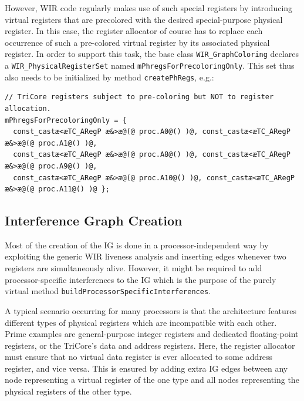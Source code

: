 However, \gls{WIR} code regularly makes use of such special registers by introducing virtual registers that are precolored with the desired special-purpose physical register.
In this case, the register allocator of course has to replace each occurrence of such a pre-colored virtual register by its associated physical register.
In order to support this task, the base class \texttt{WIR\_GraphColoring} declares a \texttt{WIR\_PhysicalRegisterSet} named \texttt{mPhregsForPrecoloringOnly}.
This set thus also needs to be initialized by method \texttt{createPhRegs}, e.g.: \\
\begin{lstlisting}[style=code,float=!ht,aboveskip=-0.8 \baselineskip,belowskip=-0.8 \baselineskip]
// TriCore registers subject to pre-coloring but NOT to register allocation.
mPhregsForPrecoloringOnly = {
  const_castæ<æTC_ARegP æ&>æ@(@ proc.A0@() )@, const_castæ<æTC_ARegP æ&>æ@(@ proc.A1@() )@,
  const_castæ<æTC_ARegP æ&>æ@(@ proc.A8@() )@, const_castæ<æTC_ARegP æ&>æ@(@ proc.A9@() )@,
  const_castæ<æTC_ARegP æ&>æ@(@ proc.A10@() )@, const_castæ<æTC_ARegP æ&>æ@(@ proc.A11@() )@ };
\end{lstlisting}


\subsection{Interference Graph Creation}
\label{ssec:igcreation}

Most of the creation of the \gls{IG} is done in a processor-independent way by exploiting the generic \gls{WIR} liveness analysis and inserting edges whenever two registers are simultaneously alive.
However, it might be required to add processor-specific interferences to the \gls{IG} which is the purpose of the purely virtual method \texttt{buildProcessor\-SpecificInterferences}.

A typical scenario occurring for many processors is that the architecture features different types of physical registers which are incompatible with each other.
Prime examples are general-purpose integer registers and dedicated floating-point registers, or the TriCore's data and address registers.
Here, the register allocator must ensure that no virtual data register is ever allocated to some address register, and vice versa.
This is ensured by adding extra \gls{IG} edges between any node representing a virtual register of the one type and all nodes representing the physical registers of the other type.

